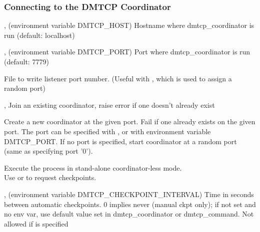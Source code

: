\subsubsection{Connecting to the DMTCP Coordinator}
\begin{Description}
  \item[\Opt{-h}, \Opt{--host} \Arg{hostname} (environment variable DMTCP_HOST)]
    Hostname where dmtcp_coordinator is run (default: localhost)

  \item[\Opt{-p}, \Opt{--port} \Arg{port} (environment variable DMTCP_PORT)]
    Port where dmtcp_coordinator is run (default: 7779)

  \item[\OptSArg{--port-file}{filename}]
    File to write listener port number.
    (Useful with , which is used to assign a random port)

  \item[\Opt{-j}, \Opt{--join}]
    Join an existing coordinator, raise error if one doesn't
    already exist

  \item[\Opt{--new-coordinator}]
    Create a new coordinator at the given port. Fail if one
    already exists on the given port. The port can be specified
    with , or with environment variable DMTCP_PORT.  If no
    port is specified, start coordinator at a random port (same
    as specifying port '0').

  \item[\Opt{--no-coordinator}]
    Execute the process in stand-alone coordinator-less mode.\\
    Use  or  to request checkpoints.

  \item[\Opt{-i}, \Opt{-interval} \Arg{seconds} (environment variable DMTCP_CHECKPOINT_INTERVAL)]
    Time in seconds between automatic checkpoints.
    0 implies never (manual ckpt only); if not set and no env var,
    use default value set in dmtcp_coordinator or dmtcp_command.
    Not allowed if  is specified
\end{Description}


